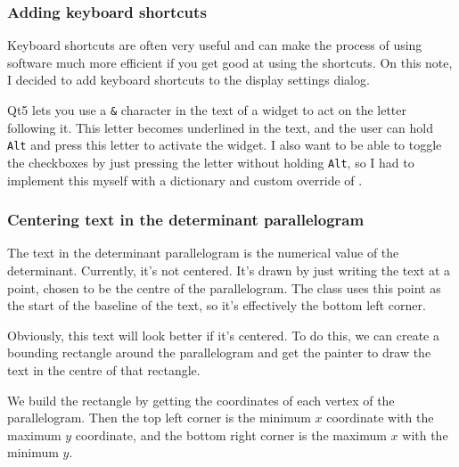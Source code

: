 \documentclass[../development.tex]{subfiles}
\begin{document}

\subsubsection{Adding keyboard shortcuts\label{development:fixing-bugs-and-adding-polish:adding-keyboard-shortcuts}}

Keyboard shortcuts are often very useful and can make the process of using software much more efficient if you get good at using the shortcuts. On this note, I decided to add keyboard shortcuts to the display settings dialog.

Qt5 lets you use a \texttt{\&} character in the text of a widget to act on the letter following it. This letter becomes underlined in the text, and the user can hold \texttt{Alt} and press this letter to activate the widget. I also want to be able to toggle the checkboxes by just pressing the letter without holding \texttt{Alt}, so I had to implement this myself with a dictionary and custom override of .


\subsubsection{Centering text in the determinant parallelogram\label{development:fixing-bugs-and-adding-polish:centering-text-in-the-determinant-parallelogram}}

The text in the determinant parallelogram is the numerical value of the determinant. Currently, it's not centered. It's drawn by just writing the text at a point, chosen to be the centre of the parallelogram. The  class uses this point as the start of the baseline of the text, so it's effectively the bottom left corner.


Obviously, this text will look better if it's centered. To do this, we can create a bounding rectangle around the parallelogram and get the painter to draw the text in the centre of that rectangle.

We build the rectangle by getting the coordinates of each vertex of the parallelogram. Then the top left corner is the minimum $x$ coordinate with the maximum $y$ coordinate, and the bottom right corner is the maximum $x$ with the minimum $y$.
\end{document}
